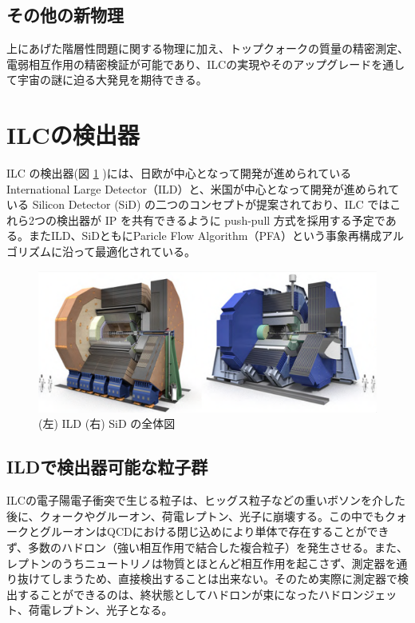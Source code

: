 \subsection{その他の新物理}
上にあげた階層性問題に関する物理に加え、トップクォークの質量の精密測定、電弱相互作用の精密検証が可能であり、ILCの実現やそのアップグレードを通して宇宙の謎に迫る大発見を期待できる。
\section{ILCの検出器}
ILC の検出器(図 \ref{ilcdetector} )には、日欧が中心となって開発が進められている International Large Detector（ILD）と、米国が中心となって開発が進められている Silicon Detector (SiD) の二つのコンセプトが提案されており、ILC ではこれら2つの検出器が IP を共有できるように push-pull 方式を採用する予定である。またILD、SiDともにParicle Flow Algorithm（PFA）という事象再構成アルゴリズムに沿って最適化されている。
\begin{figure}[h]
	\begin{center}
        \includegraphics[keepaspectratio, scale=0.4]
 	{Figure/Introduction/detector.png}
 		\caption[ILDとSiDの全体図]{(左) ILD (右) SiD の全体図~\cite{tdr2}}
 		\label{ilcdetector}
	\end{center}
\end{figure}
\subsection{ILDで検出器可能な粒子群}
ILCの電子陽電子衝突で生じる粒子は、ヒッグス粒子などの重いボソンを介した後に、クォークやグルーオン、荷電レプトン、光子に崩壊する。この中でもクォークとグルーオンはQCDにおける閉じ込めにより単体で存在することができず、多数のハドロン（強い相互作用で結合した複合粒子）を発生させる。また、レプトンのうちニュートリノは物質とほとんど相互作用を起こさず、測定器を通り抜けてしまうため、直接検出することは出来ない。そのため実際に測定器で検出することができるのは、終状態としてハドロンが束になったハドロンジェット、荷電レプトン、光子となる。
